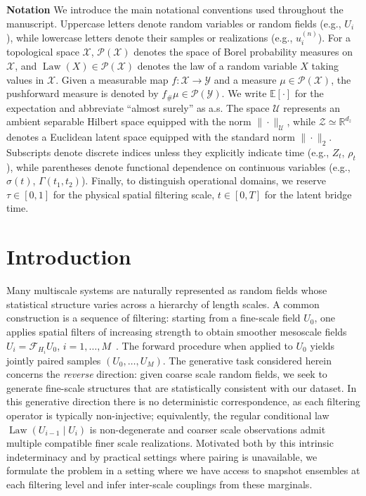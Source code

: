 \documentclass[review,onefignum,onetabnum]{siamart250211}
\newcommand{\E}{\mathbb{E}}
\newcommand{\R}{\mathbb{R}}
\newcommand{\cX}{\mathcal{X}}
\newcommand{\Law}{\operatorname{Law}}
\newcommand{\1}{\mathbf{1}}
\newcommand{\cU}{\mathcal{U}}
\newcommand{\cZ}{\mathcal{Z}}
\newcommand{\cP}{\mathcal{P}}
\newcommand{\cF}{\mathcal{F}}
\begin{document}
\noindent\textbf{Notation}\label{sec:notation}
We introduce the main notational conventions used throughout the manuscript. Uppercase letters denote random variables or random fields (e.g., $U_i$), while lowercase letters denote their samples or realizations (e.g., $u_i^{(n)}$). For a topological space $\cX$, $\cP(\cX)$ denotes the space of Borel probability measures on $\cX$, and $\Law(X)\in\cP(\cX)$ denotes the law of a random variable $X$ taking values in $\cX$. Given a measurable map $f:\cX\to\mathcal{Y}$ and a measure $\mu\in\cP(\cX)$, the pushforward measure is denoted by $f_\#\mu \in \cP(\mathcal{Y})$. We write $\E[\cdot]$ for the expectation and abbreviate ``almost surely'' as a.s. The space $\cU$ represents an ambient separable Hilbert space equipped with the norm $\|\cdot\|_{\cU}$, while $\cZ \simeq \R^{d_z}$ denotes a Euclidean latent space equipped with the standard norm $\|\cdot\|_2$. Subscripts denote discrete indices unless they explicitly indicate time (e.g., $Z_t$, $\rho_t$), while parentheses denote functional dependence on continuous variables (e.g., $\sigma(t)$, $\Gamma(t_1,t_2)$). Finally, to distinguish operational domains, we reserve $\tau \in [0,1]$ for the physical spatial filtering scale, $t \in [0,T]$ for the latent bridge time.

\section{Introduction}\label{sec:intro}

Many multiscale systems are naturally represented as random fields whose statistical structure varies across a hierarchy of length scales. A common construction is a sequence of filtering: starting from a fine-scale field $U_0$, one applies spatial filters of increasing strength to obtain smoother mesoscale fields $U_i=\cF_{H_i}U_0$, $i=1,\dots,M$~\cite{tran2016stochastic}. The forward procedure when applied to $U_0$ yields jointly paired samples $(U_0,\dots,U_M)$. The generative task considered herein concerns the \emph{reverse} direction: given coarse scale random fields, we seek to generate fine-scale structures that are statistically consistent with our dataset. In this generative direction there is no deterministic correspondence, as each filtering operator is typically non-injective; equivalently, the regular conditional law $\Law(U_{i-1}\mid U_i)$ is non-degenerate and coarser scale observations admit multiple compatible finer scale realizations. Motivated both by this intrinsic indeterminacy and by practical settings where pairing is unavailable, we formulate the problem in a setting where we have access to snapshot ensembles at each filtering level and infer inter-scale couplings from these marginals.
\end{document}
